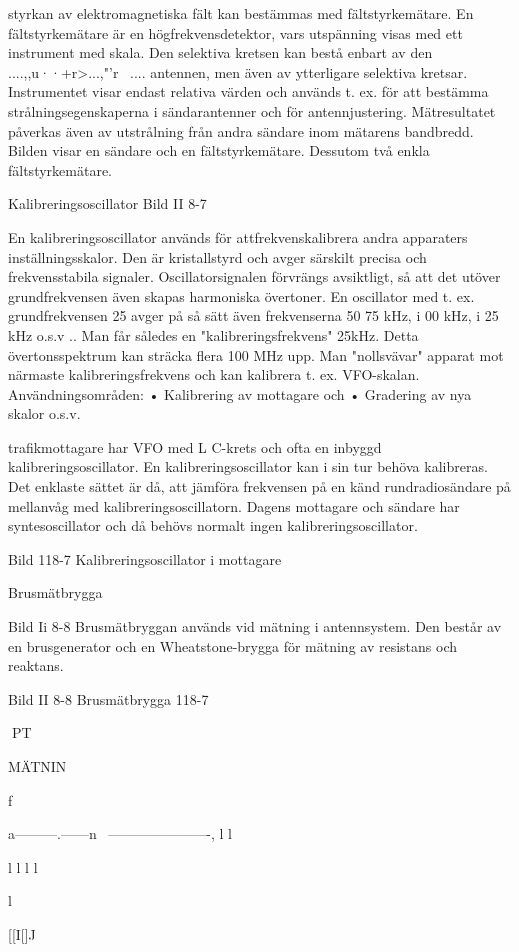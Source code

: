 \documentclass[a4paper,twoside,twocolumn,openright]{book}
\begin{document}
{{{{{styrkan av elektromagnetiska fält kan bestämmas med fältstyrkemätare.
En fältstyrkemätare är en högfrekvensdetektor, vars utspänning visas med ett instrument med skala. Den selektiva
kretsen kan bestå enbart av den ....,,u··+r>...,"'r~ ....
antennen, men även av ytterligare selektiva
kretsar. Instrumentet visar endast relativa
värden och används t. ex. för att bestämma
strålningsegenskaperna i sändarantenner
och för antennjustering. Mätresultatet påverkas även av utstrålning från andra sändare inom mätarens bandbredd. Bilden visar
en sändare och en fältstyrkemätare. Dessutom två enkla fältstyrkemätare.

Kalibreringsoscillator
Bild II 8-7

En kalibreringsoscillator används för attfrekvenskalibrera andra apparaters inställningsskalor. Den är kristallstyrd och avger särskilt
precisa och frekvensstabila signaler.
Oscillatorsignalen förvrängs avsiktligt, så
att det utöver grundfrekvensen även skapas
harmoniska övertoner. En
oscillator med t. ex. grundfrekvensen 25
avger på så sätt även frekvenserna 50
75 kHz, i 00 kHz, i 25 kHz o.s.v .. Man får
således en "kalibreringsfrekvens"
25kHz.
Detta övertonsspektrum kan sträcka
flera 100 MHz upp. Man "nollsvävar"
apparat mot närmaste kalibreringsfrekvens
och kan kalibrera t. ex. VFO-skalan.
Användningsområden:
• Kalibrering av mottagare och
• Gradering av nya skalor o.s.v.

trafikmottagare har VFO med
L C-krets och ofta en inbyggd kalibreringsoscillator. En kalibreringsoscillator kan i sin tur
behöva kalibreras. Det enklaste sättet är då,
att jämföra frekvensen på en känd rundradiosändare på mellanvåg med kalibreringsoscillatorn. Dagens mottagare och sändare
har syntesoscillator och då behövs normalt
ingen kalibreringsoscillator.

Bild 118-7 Kalibreringsoscillator i mottagare

Brusmätbrygga

Bild Ii 8-8
Brusmätbryggan används vid mätning i antennsystem. Den består av en brusgenerator och en Wheatstone-brygga för mätning
av resistans och reaktans.

Bild II 8-8 Brusmätbrygga
118-7

PT

MÄTNIN

f~

a---------.------n
~----------------------,
l
l

l
l
l
l

l

[[I[]J

}}}}}
\end{document}
